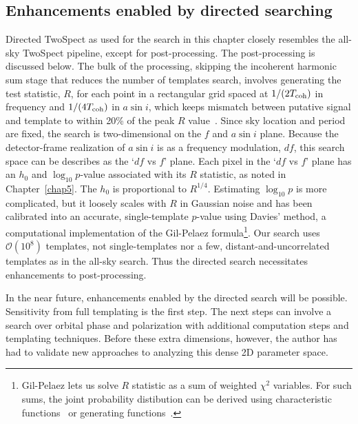 
            \subsection{Enhancements enabled by directed searching}
            \label{directed_enhancements}

Directed TwoSpect as used for the search in this chapter closely resembles the all-sky TwoSpect pipeline, except for post-processing. 
The post-processing is discussed below.
The bulk of the processing, skipping the incoherent harmonic sum stage that reduces the number of templates search, involves generating the test statistic, $R$, for each point in a rectangular grid spaced at $1/(2T_\textup{coh})$ in frequency and $1/(4T_\textup{coh})$ in $a \sin i$, which keeps mismatch between putative signal and template to within 20\% of the peak $R$ value~\cite{GoetzTwoSpectMethods2011}.
Since sky location and period are fixed, the search is two-dimensional on the $f$ and $a \sin i$ plane. 
Because the detector-frame realization of $a \sin i$ is as a frequency modulation, $df$, this search space can be describes as the `$df$ vs $f$' plane.
Each pixel in the `$df$ vs $f$' plane has an $h_0$ and $\log_{10} p$-value associated with its $R$ statistic, as noted in Chapter~\ref{chap5}.
The $h_0$ is proportional to $R^{1/4}$.
Estimating $\log_{10} p$ is more complicated, but it loosely scales with $R$ in Gaussian noise and has been calibrated into an accurate, single-template $p$-value using Davies' method, a computational implementation of the Gil-Pelaez formula\footnote{Gil-Pelaez lets us solve $R$ statistic as a sum of weighted $\chi^2$ variables. For such sums, the joint probability distibution can be derived using characteristic functions~\cite{GoetzThesis} or generating functions~\cite{RomeroThesis}.}.
Our search uses $\mathcal{O}(10^8)$ templates, not single-templates nor a few, distant-and-uncorrelated templates as in the all-sky search.
Thus the directed search necessitates enhancements to post-processing.

In the near future, enhancements enabled by the directed search will be possible.
Sensitivity from full templating is the first step.
The next steps can involve a search over orbital phase and polarization with additional computation steps and templating techniques.
Before these extra dimensions, however, the author has had to validate new approaches to analyzing this dense 2D parameter space.


